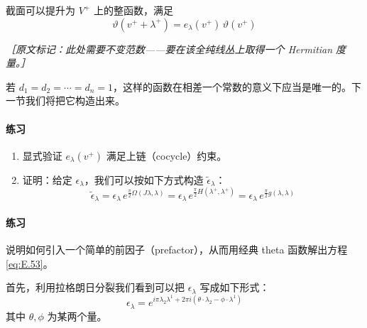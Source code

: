 
截面可以提升为 $V^+$ 上的整函数，满足
\begin{equation}
  \vartheta(v^+ + \lambda^+) = e_\lambda(v^+)\,\vartheta(v^+)
  \tag{E.53}
  \label{eq:E.53}
\end{equation}

{\small\itshape ［原文标记：此处需要不变范数——要在该全纯线丛上取得一个 Hermitian 度量。］}

若 $d_1 = d_2 = \cdots = d_n = 1$，这样的函数在相差一个常数的意义下应当是唯一的。下一节我们将把它构造出来。

\paragraph{练习}
\begin{enumerate}[label=(\alph*)]
  \item 显式验证 $e_\lambda(v^+)$ 满足上链（cocycle）约束。
  \item 证明：给定 $\epsilon_\lambda$，我们可以按如下方式构造 $\tilde\epsilon_\lambda$：
\begin{equation}
  \tilde\epsilon_\lambda
  = \epsilon_\lambda\,e^{\frac{\pi}{2}\Omega(J\lambda,\lambda)}
  = \epsilon_\lambda\,e^{\frac{\pi}{2}H(\lambda^+,\lambda^+)}
  = \epsilon_\lambda\,e^{\frac{\pi}{2}g(\lambda,\lambda)}
  \tag{E.54}
  \label{eq:E.54}
\end{equation}
\end{enumerate}

\paragraph{练习}
说明如何引入一个简单的前因子（prefactor），从而用经典 theta 函数解出方程 \eqref{eq:E.53}。

首先，利用拉格朗日分裂我们看到可以把 $\epsilon_\lambda$ 写成如下形式：
\begin{equation}
  \epsilon_\lambda = e^{i\pi\lambda_2\lambda^1 + 2\pi i(\theta\cdot\lambda_2 - \phi\cdot\lambda^1)}
  \tag{E.55}
  \label{eq:E.55}
\end{equation}
其中 $\theta,\phi$ 为某两个量。

